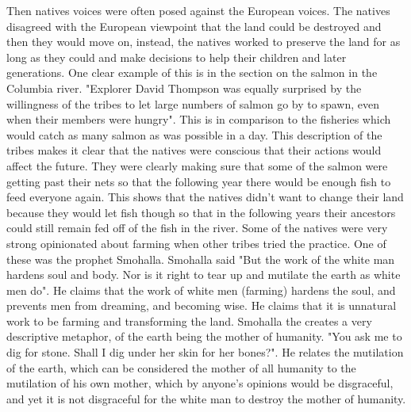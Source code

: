 \documentclass{article}
\begin{document}
\par
Then natives voices were often posed against the European voices. The natives disagreed with the European viewpoint that the land could be destroyed and then they would move on, instead, the natives worked to preserve the land for as long as they could and make decisions to help their children and later generations. One clear example of this is in the section on the salmon in the Columbia river. "Explorer David Thompson was equally surprised by the willingness of the tribes to let large numbers of salmon go by to spawn, even when their members were hungry"\cite[155]{NWP}. This is in comparison to the fisheries which would catch as many salmon as was possible in a day. This description of the tribes makes it clear that the natives were conscious that their actions would affect the future. They were clearly making sure that some of the salmon were getting past their nets so that the following year there would be enough fish to feed everyone again. This shows that the natives didn't want to change their land because they would let fish though so that in the following years their ancestors could still remain fed off of the fish in the river. Some of the natives were very strong opinionated about farming when other tribes tried the practice. One of these was the prophet Smohalla. Smohalla said "But the work of the white man hardens soul and body. Nor is it right to tear up and mutilate the earth as white men do"\cite[152]{NWP}. He claims that the work of white men (farming) hardens the soul, and prevents men from dreaming, and becoming wise. He claims that it is unnatural work to be farming and transforming the land. Smohalla the creates a very descriptive metaphor, of the earth being the mother of humanity. "You ask me to dig for stone. Shall I dig under her skin for her bones?"\cite[152]{NWP}. He relates the mutilation of the earth, which can be considered the mother of all humanity to the mutilation of his own mother, which by anyone's opinions would be disgraceful, and yet it is not disgraceful for the white man to destroy the mother of humanity.
\par
\end{document}
